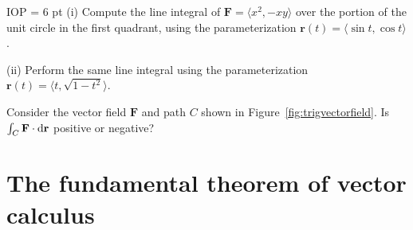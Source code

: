 \documentclass{watsonbook}
\begin{document}
\begin{exercise}{}{IOP} \parskip = 6 pt
  (i) Compute the line integral of
  $\mathbf{F} = \langle x^2,-xy\rangle$ over the portion of the unit
  circle in the first quadrant, using the parameterization
  $\mathbf{r}(t) = \langle \sin t, \cos t \rangle$. 

  (ii) Perform the same line integral using the parameterization
  $\mathbf{r}(t) = \langle t, \sqrt{1-t^2} \rangle$.
\end{exercise}

\begin{exercise}{}{}
  Consider the vector field $\mathbf{F}$ and path $C$ shown in
  Figure~\ref{fig:trigvectorfield}. Is
  $\int_C \mathbf{F} \cdot \mathrm{d}\mathbf{r}$ positive or negative?
\end{exercise}

\section{The fundamental theorem of vector calculus} \label{sec:line_integrals}

\end{document}
